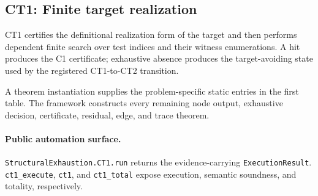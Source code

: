 \subsection{CT1: Finite target realization}
\label{sec:ct1-automation}

CT1 certifies the definitional realization form of the target and then performs dependent finite search over test indices and their witness enumerations. A hit produces the C1 certificate; exhaustive absence produces the target-avoiding state used by the registered CT1-to-CT2 transition.

A theorem instantiation supplies the problem-specific static entries in the first table. The framework constructs every remaining node output, exhaustive decision, certificate, residual, edge, and trace theorem.

\paragraph{Public automation surface.}
\texttt{StructuralExhaustion.CT1.run} returns the evidence-carrying \texttt{ExecutionResult}. \texttt{ct1\_\allowbreak{}execute}, \texttt{ct1}, and \texttt{ct1\_\allowbreak{}total} expose execution, semantic soundness, and totality, respectively.

